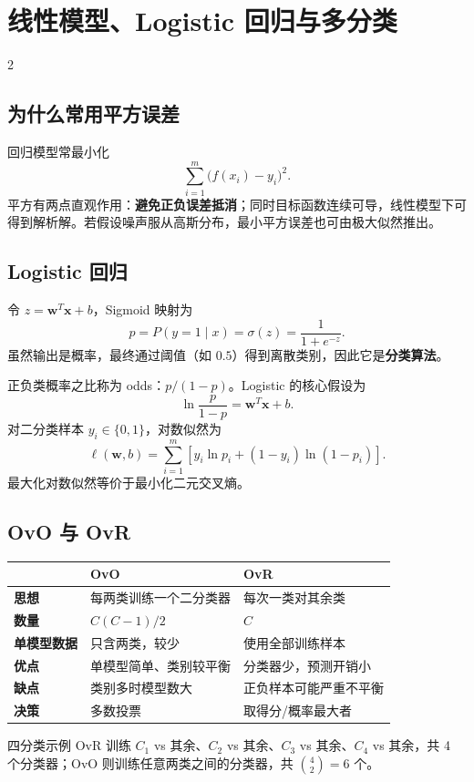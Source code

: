 \documentclass[9pt,a4paper,UTF8]{ctexart}
\begin{document}
\section{线性模型、Logistic 回归与多分类}
\begin{multicols}{2}
\subsection{为什么常用平方误差}
回归模型常最小化
\[
\sum_{i=1}^{m}\bigl(f(x_i)-y_i\bigr)^2.
\]
平方有两点直观作用：\textbf{避免正负误差抵消}；同时目标函数连续可导，线性模型下可得到解析解。若假设噪声服从高斯分布，最小平方误差也可由极大似然推出。

\subsection{Logistic 回归}
令 $z=\bm w^T\bm x+b$，Sigmoid 映射为
\[
p=P(y=1\mid x)=\sigma(z)=\frac{1}{1+e^{-z}}.
\]
虽然输出是概率，最终通过阈值（如 $0.5$）得到离散类别，因此它是\textbf{分类算法}。

正负类概率之比称为 odds：$p/(1-p)$。Logistic 的核心假设为
\[
\ln\frac{p}{1-p}=\bm w^T\bm x+b.
\]
对二分类样本 $y_i\in\{0,1\}$，对数似然为
\[
\ell(\bm w,b)=\sum_{i=1}^{m}\left[y_i\ln p_i+(1-y_i)\ln(1-p_i)\right].
\]
最大化对数似然等价于最小化二元交叉熵。

\subsection{OvO 与 OvR}
\begin{tabularx}{\columnwidth}{>{\bfseries}p{}XX}
\toprule
& OvO & OvR\\\midrule
思想 & 每两类训练一个二分类器 & 每次一类对其余类\\
数量 & $C(C-1)/2$ & $C$\\
单模型数据 & 只含两类，较少 & 使用全部训练样本\\
优点 & 单模型简单、类别较平衡 & 分类器少，预测开销小\\
缺点 & 类别多时模型数大 & 正负样本可能严重不平衡\\
决策 & 多数投票 & 取得分/概率最大者\\
\bottomrule
\end{tabularx}

\begin{keybox}{四分类示例}
OvR 训练 $C_1$ vs 其余、$C_2$ vs 其余、$C_3$ vs 其余、$C_4$ vs 其余，共 4 个分类器；OvO 则训练任意两类之间的分类器，共 $\binom42=6$ 个。
\end{keybox}
\end{multicols}
\end{document}
